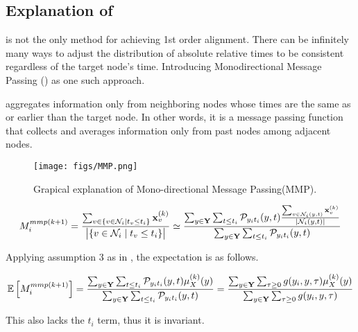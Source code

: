 \subsection{Explanation of \MMP}
\label{apdx:MMP}
\PMP is not the only method for achieving 1st order alignment. There can be infinitely many ways to adjust the distribution of absolute relative times to be consistent regardless of the target node's time. Introducing Monodirectional Message Passing (\MMP) as one such approach.

\MMP aggregates information only from neighboring nodes whose times are the same as or earlier than the target node. In other words, it is a message passing function that collects and averages information only from past nodes among adjacent nodes.

\begin{figure}[hbt!]
	\vspace{-0.15in}
	\centering
	\texttt{[image: figs/MMP.png]}
	\vspace{-0.1in}
	\caption{Grapical explanation of Mono-directional Message Passing(MMP).}
	 \label{fig:MMP}
	 \vspace{-0.3in}
\end{figure}

\begin{align}
M_{i}^{mmp(k+1)} = {{\sum_{v\in \{v\in \mathcal{N}_i \mid t_v \le t_i \}} \bold{x}_{v}^{(k)}}\over{\big|\{v\in \mathcal{N}_i \mid t_v \le t_i \}\big| }} \simeq {\sum_{y\in \bold{Y}}\sum_{t\le t_i}{\mathcal{P}_{y_i t_i}(y,t)}{\sum_{v\in \mathcal{N}_{i}(y, t) }\bold{x}_v^{(k)} \over |\mathcal{N}_i(y,t)|}\over \sum_{y\in \bold{Y}}\sum_{t\le t_i}{\mathcal{P}_{y_i t_i}(y,t)}}
\end{align}


Applying assumption 3 as in \PMP, the expectation is as follows.

\begin{align}
\mathbb E\left[{M_{ i}^{mmp(k+1)}}\right] = {\sum_{y\in \bold{Y}}\sum_{t\le t_i }\mathcal{P}_{y_i t_i}(y, t) \mu_{X}^{(k)}(y)\over \sum_{y\in \bold{Y}}\sum_{t\le t_i }\mathcal{P}_{y_i t_i}(y, t)}={\sum_{y\in \bold{Y}}\sum_{\tau\ge 0}g(y_i, y,\tau) \mu_{X}^{(k)}(y)\over \sum_{y\in \bold{Y}}\sum_{\tau\ge 0}g(y_i, y,\tau)}
\end{align}


This also lacks the $t_i$ term, thus it is invariant.








